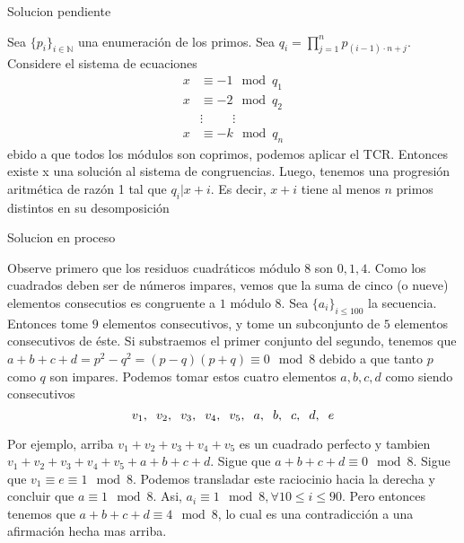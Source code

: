 \begin{sol}
	Solucion pendiente
\end{sol}

\begin{sol}
	Sea $\{p_{i}\}_{i\in \mathbb{N}}$ una enumeraci\'on de los primos. Sea $q_{i} = \prod_{j=1}^{n} p_{(i-1)\cdot n + j }$. Considere el sistema de ecuaciones
	\begin{align}
	x &\equiv -1 \mod q_{1} \\
	x&\equiv -2 \mod q_{2} \\
	&\vdots \hspace{1cm} \vdots \\
	x &\equiv -k \mod q_{n}   
	\end{align}
	ebido a que todos los m\'odulos son coprimos, podemos aplicar el TCR. Entonces existe x una soluci\'on al sistema de congruencias. Luego, tenemos una progresi\'on aritm\'etica de raz\'on 1 tal que $q_{i} |x+i$. Es decir, $x+i$ tiene al menos $n$ primos distintos en su desomposici\'on 
\end{sol}

\begin{sol}
	Solucion en proceso
\end{sol}

\begin{sol}
	Observe primero que los residuos cuadr\'aticos m\'odulo $8$ son $0, 1, 4$. Como los cuadrados deben ser de n\'umeros impares, vemos que la suma de cinco (o nueve) elementos consecutios es congruente a $1$ m\'odulo $8$. Sea $\{a_{i}\}_{i \leq 100}$ la secuencia. Entonces tome $9$ elementos consecutivos, y tome un subconjunto de $5$ elementos consecutivos de \'este. Si substraemos el primer conjunto del segundo, tenemos que $a+b+c+d = p^2-q^2 = (p-q)(p+q) \equiv 0 \mod 8$ debido a que tanto $p$ como $q$ son impares. Podemos tomar estos cuatro elementos $a, b, c, d$ como siendo consecutivos
	\begin{equation}
	v_{1}, \hspace{0.2cm} v_{2}, \hspace{0.2cm} v_{3}, \hspace{0.2cm} v_{4}, \hspace{0.2cm} v_{5}, \hspace{0.2cm} a, \hspace{0.2cm} b, \hspace{0.2cm} c, \hspace{0.2cm} d, \hspace{0.2cm} e
	\end{equation}
	
	Por ejemplo, arriba $v_{1}+v_{2}+v_{3}+v_{4}+v_{5} $ es un cuadrado perfecto y tambien $v_{1}+v_{2}+v_{3}+v_{4}+v_{5} +a+b+c+d$. Sigue que $a+b+c+d \equiv 0 \mod 8$. Sigue que $v_{1} \equiv e \equiv 1 \mod 8$. Podemos transladar este raciocinio hacia la derecha y concluir que $a \equiv 1 \mod 8$. Asi, $a_{i} \equiv 1 \mod 8, \forall 10\leq i \leq 90$. Pero entonces tenemos que $a+b+c+d \equiv 4 \mod 8$, lo cual es una contradicci\'on a una afirmaci\'on hecha mas arriba.
\end{sol}

